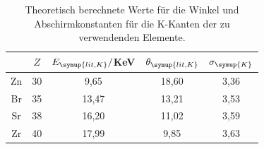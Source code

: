 \begin{table}
	\begin{center}
    \caption{Theoretisch berechnete Werte für die Winkel und Abschirmkonstanten
    für die K-Kanten der zu verwendenden Elemente.}
    \label{tab:theoriewerte}
		\begin{tabular}{ccccc}
		\toprule
			& {$Z$} & {$E_{\symup{lit, K}}/$KeV} & {$\theta_{\symup{lit, K}}$} & {$\sigma_{\symup{K}}$}\\
			\midrule
			Zn & 30  & 9,65  &  18,60   &  3,36  \\
      Br &  35  & 13,47 &  13,21  &  3,53 \\
      Sr &  38  & 16,20 &  11,02  &  3,59 \\
      Zr &  40  & 17,99 &  9,85   &  3,63 \\
		\bottomrule
		\end{tabular}
	\end{center}
\end{table}

